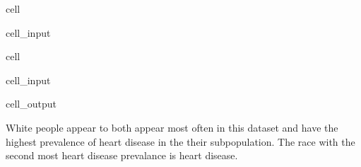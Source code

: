 \documentclass[letterpaper,10pt,english]{jupyterBook}
\begin{document}
\begin{sphinxuseclass}{cell}
\begin{sphinxVerbatimInput}
\begin{sphinxuseclass}{cell_input}
\begin{sphinxVerbatim}[commandchars=\\\{\}]
      \PYG{p}{]}
\end{sphinxVerbatim}

\end{sphinxuseclass}\end{sphinxVerbatimInput}

\end{sphinxuseclass}
\begin{sphinxuseclass}{cell}\begin{sphinxVerbatimInput}

\begin{sphinxuseclass}{cell_input}
\begin{sphinxVerbatim}[commandchars=\\\{\}]
\end{sphinxVerbatim}

\end{sphinxuseclass}\end{sphinxVerbatimInput}
\begin{sphinxVerbatimOutput}

\begin{sphinxuseclass}{cell_output}
\noindent{}

\end{sphinxuseclass}\end{sphinxVerbatimOutput}

\end{sphinxuseclass}
\sphinxAtStartPar
White people appear to both appear most often in this dataset and have the highest prevalence of heart disease in the their sub\sphinxhyphen{}population. The race with the second most heart disease prevalance is heart disease.
\end{document}
